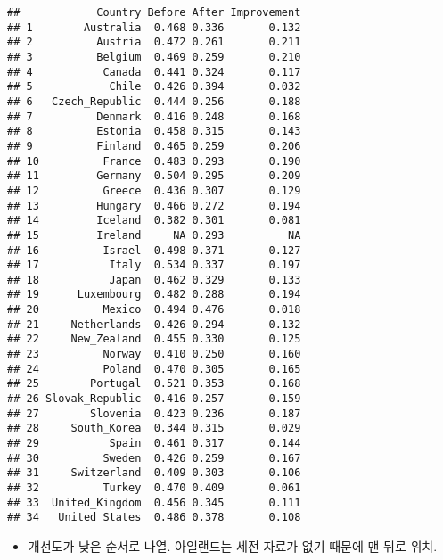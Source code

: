 \documentclass[
]{article}
\newenvironment{Shaded}{\begin{snugshade}}{\end{snugshade}}
\newcommand{\DecValTok}[1]{\textcolor[rgb]{0.00,0.00,0.81}{#1}}
\newcommand{\FunctionTok}[1]{\textcolor[rgb]{0.00,0.00,0.00}{#1}}
\newcommand{\NormalTok}[1]{#1}
\newcommand{\OtherTok}[1]{\textcolor[rgb]{0.56,0.35,0.01}{#1}}
\newcommand{\SpecialCharTok}[1]{\textcolor[rgb]{0.00,0.00,0.00}{#1}}
\providecommand{\tightlist}{%
  \setlength{\itemsep}{0pt}\setlength{\parskip}{0pt}}
\begin{document}
\begin{Shaded}
\end{Shaded}

\begin{verbatim}
##            Country Before After Improvement
## 1        Australia  0.468 0.336       0.132
## 2          Austria  0.472 0.261       0.211
## 3          Belgium  0.469 0.259       0.210
## 4           Canada  0.441 0.324       0.117
## 5            Chile  0.426 0.394       0.032
## 6   Czech_Republic  0.444 0.256       0.188
## 7          Denmark  0.416 0.248       0.168
## 8          Estonia  0.458 0.315       0.143
## 9          Finland  0.465 0.259       0.206
## 10          France  0.483 0.293       0.190
## 11         Germany  0.504 0.295       0.209
## 12          Greece  0.436 0.307       0.129
## 13         Hungary  0.466 0.272       0.194
## 14         Iceland  0.382 0.301       0.081
## 15         Ireland     NA 0.293          NA
## 16          Israel  0.498 0.371       0.127
## 17           Italy  0.534 0.337       0.197
## 18           Japan  0.462 0.329       0.133
## 19      Luxembourg  0.482 0.288       0.194
## 20          Mexico  0.494 0.476       0.018
## 21     Netherlands  0.426 0.294       0.132
## 22     New_Zealand  0.455 0.330       0.125
## 23          Norway  0.410 0.250       0.160
## 24          Poland  0.470 0.305       0.165
## 25        Portugal  0.521 0.353       0.168
## 26 Slovak_Republic  0.416 0.257       0.159
## 27        Slovenia  0.423 0.236       0.187
## 28     South_Korea  0.344 0.315       0.029
## 29           Spain  0.461 0.317       0.144
## 30          Sweden  0.426 0.259       0.167
## 31     Switzerland  0.409 0.303       0.106
## 32          Turkey  0.470 0.409       0.061
## 33  United_Kingdom  0.456 0.345       0.111
## 34   United_States  0.486 0.378       0.108
\end{verbatim}

\begin{itemize}
\tightlist
\item
  개선도가 낮은 순서로 나열. 아일랜드는 세전 자료가 없기 때문에 맨 뒤로
  위치.
\end{itemize}

\begin{Shaded}
\end{Shaded}
\end{document}
